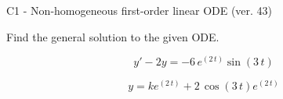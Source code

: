\begin{exercise}
  \begin{exerciseTitle}C1 - Non-homogeneous first-order linear ODE (ver. 43)\end{exerciseTitle}
  \begin{exerciseStatement}
    
Find the general solution to the given ODE.

    
\[y'-2y= -6 \, e^{\left(2 \, t\right)} \sin\left(3 \, t\right)\]

  \end{exerciseStatement}
  \begin{exerciseAnswer}
    
\[y= k e^{\left(2 \, t\right)} + 2 \, \cos\left(3 \, t\right) e^{\left(2 \, t\right)}\]

  \end{exerciseAnswer}
\end{exercise}